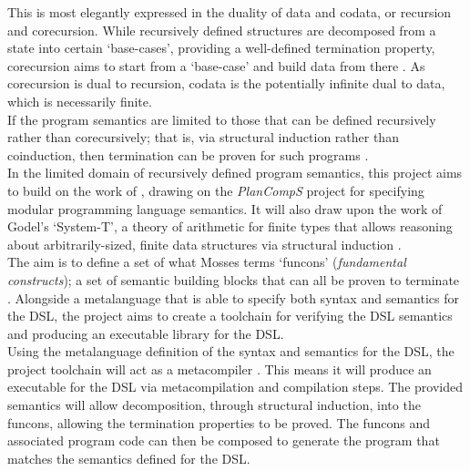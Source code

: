 \documentclass[a4paper,11pt]{report}
\begin{document}
This is most elegantly expressed in the duality of data and codata, or recursion and corecursion. 
While recursively defined structures are decomposed from a state into certain `base-cases', providing a well-defined termination property, corecursion aims to start from a `base-case' and build data from there \citep{hinze2010reasoning}.
As corecursion is dual to recursion, codata is the potentially infinite dual to data, which is necessarily finite. \\

If the program semantics are limited to those that can be defined recursively rather than corecursively; that is, via structural induction rather than coinduction, then termination can be proven for such programs \citep{nordstrom1988terminating}.\\

In the limited domain of recursively defined program semantics, this project aims to build on the work of \cite{doh2001composing}, drawing on the \textit{PlanCompS} project for specifying modular programming language semantics.
It will also draw upon the work of Godel's `System-T', a theory of arithmetic for finite types that allows reasoning about arbitrarily-sized, finite data structures via structural induction \cite{girard1989proofs,alves2010godel}.\\

The aim is to define a set of what Mosses terms `funcons' (\textit{fundamental constructs}); a set of semantic building blocks that can all be proven to terminate \cite{churchill2014reusable}.
Alongside a metalanguage that is able to specify both syntax and semantics for the DSL, the project aims to create a toolchain for verifying the DSL semantics and producing an executable library for the DSL.\\

Using the metalanguage definition of the syntax and semantics for the DSL, the project toolchain will act as a metacompiler \cite{Mandell:1966:MDA:800267.810785}.
This means it will produce an executable for the DSL via metacompilation and compilation steps.
The provided semantics will allow decomposition, through structural induction, into the funcons, allowing the termination properties to be proved.
The funcons and associated program code can then be composed to generate the program that matches the semantics defined for the DSL.\\

\end{document}
